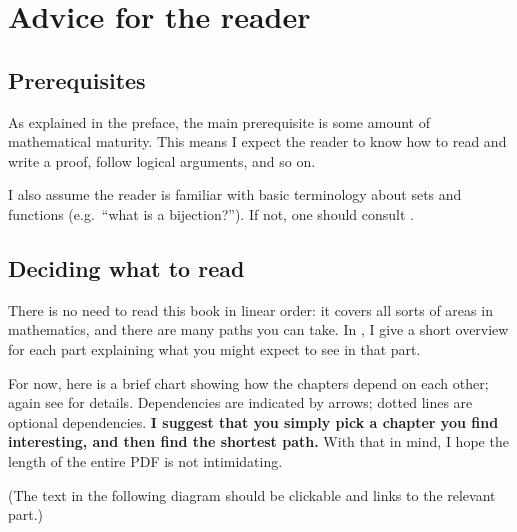\chapter{Advice for the reader}

\section{Prerequisites}
As explained in the preface,
the main prerequisite is some amount of mathematical maturity.
This means I expect the reader to know how
to read and write a proof, follow logical arguments, and so on.

I also assume the reader is familiar with basic terminology
about sets and functions (e.g.\ ``what is a bijection?'').
If not, one should consult .

\section{Deciding what to read}
There is no need to read this book in linear order:
it covers all sorts of areas in mathematics,
and there are many paths you can take.
In , I give a short overview for each part
explaining what you might expect to see in that part.

For now, here is a brief chart showing
how the chapters depend on each other;
again see  for details.
Dependencies are indicated by arrows;
dotted lines are optional dependencies.
\textbf{I suggest that you simply pick a chapter you find interesting,
and then find the shortest path.}
With that in mind, I hope the length of the entire PDF is not intimidating.

(The text in the following diagram should be clickable
and links to the relevant part.)


\newpage

